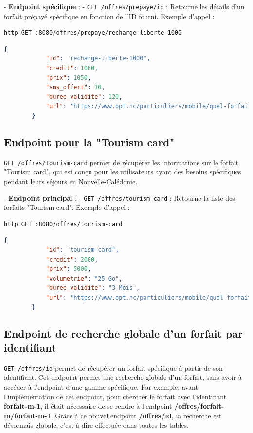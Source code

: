 \documentclass{article}
\begin{document}
	- \textbf{Endpoint spécifique} :
	- \texttt{GET /offres/prepaye/{id}} : Retourne les détails d'un forfait prépayé spécifique en fonction de l'ID fourni.
	Exemple d'appel :
	\begin{lstlisting}[language=bash]
		http GET :8080/offres/prepaye/recharge-liberte-1000
	\end{lstlisting}
	\begin{lstlisting}[language=JSON]
		{
			"id": "recharge-liberte-1000",
			"credit": 1000,
			"prix": 1050,
			"sms_offert": 10,
			"duree_validite": 120,
			"url": "https://www.opt.nc/particuliers/mobile/quel-forfait-choisir/kit-prepaye-liberte"
		}
	\end{lstlisting}
	
	\subsection{Endpoint pour la "Tourism card"}
	\texttt{GET /offres/tourism-card} permet de récupérer les informations sur le forfait "Tourism card", qui est conçu pour les utilisateurs ayant des besoins spécifiques pendant leurs séjours en Nouvelle-Calédonie.
	
	- \textbf{Endpoint principal} :
	- \texttt{GET /offres/tourism-card} : Retourne la liste des forfaits "Tourism card".
	Exemple d'appel :
	\begin{lstlisting}[language=bash]
		http GET :8080/offres/tourism-card
	\end{lstlisting}
	\begin{lstlisting}[language=JSON]
		{
			"id": "tourism-card",
			"credit": 2000,
			"prix": 5000,
			"volumetrie": "25 Go",
			"duree_validite": "3 Mois",
			"url": "https://www.opt.nc/particuliers/mobile/quel-forfait-choisir/tourism-card-1000"
		}
	\end{lstlisting}
	

	
	\subsection{Endpoint de recherche globale d'un forfait par identifiant}
	
	\texttt{GET /offres/{id}} permet de récupérer un forfait spécifique à partir de son identifiant. Cet endpoint permet une recherche globale d'un forfait, sans avoir à accéder à l'endpoint d'une gamme spécifique. Par exemple, avant l'implémentation de cet endpoint, pour chercher le forfait avec l'identifiant \textbf{forfait-m-1}, il était nécessaire de se rendre à l'endpoint \textbf{/offres/forfait-m/forfait-m-1}. Grâce à ce nouvel endpoint \textbf{/offres/{id}}, la recherche est désormais globale, c'est-à-dire effectuée dans toutes les tables.
\end{document}

